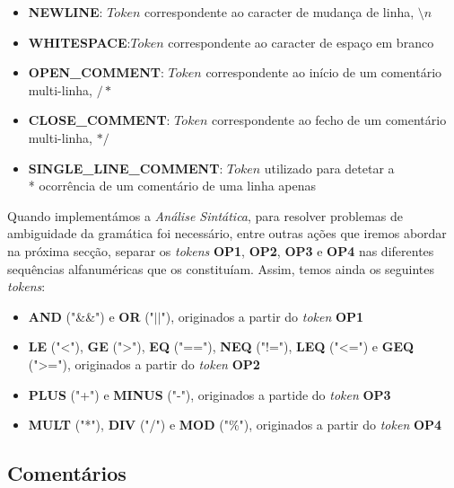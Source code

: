 \documentclass[11pt,a4paper]{article}
\begin{document}
	\begin{itemize}
	\item \textbf{NEWLINE}: $Token$ correspondente ao caracter de mudança de linha, $\setminus n$
	
	\item \textbf{WHITESPACE}:$Token$ correspondente ao caracter de espaço em branco
	
	\item \textbf{OPEN\_COMMENT}:  $Token$ correspondente ao início de um comentário multi-linha, $/*$
	
	\item \textbf{CLOSE\_COMMENT}: $Token$ correspondente ao fecho de um comentário multi-linha, $*/$
	
	\item \textbf{SINGLE\_LINE\_COMMENT}: $Token$ utilizado para detetar a \\* ocorrência de um comentário de uma linha apenas
	\end{itemize}
	
	Quando implementámos a \emph{Análise Sintática}, para resolver problemas de ambiguidade da gramática foi necessário, entre outras ações que iremos abordar na próxima secção, separar os \emph{tokens} \textbf{OP1}, \textbf{OP2}, \textbf{OP3} e \textbf{OP4} nas diferentes sequências alfanuméricas que os constituíam. Assim, temos ainda os seguintes \emph{tokens}:
	
	\begin{itemize}
	\item \textbf{AND} ("\&\&") e \textbf{OR} ("$||$"), originados a partir do \emph{token} \textbf{OP1}
	
	\item \textbf{LE} ("<"), \textbf{GE} (">"), \textbf{EQ} ("=="), \textbf{NEQ} ("!="), \textbf{LEQ} ("<=") e \textbf{GEQ} (">="), originados a partir do \emph{token} \textbf{OP2}
	
	\item \textbf{PLUS} ("+") e \textbf {MINUS} ("-"), originados a partide do \emph{token} \textbf{OP3}
	
	\item \textbf{MULT} ("*"), \textbf{DIV} ("/") e \textbf{MOD} ("\%"), originados a partir do \emph{token} \textbf{OP4}
	\end{itemize}
	
	\subsection{Comentários}
	
\end{document}
